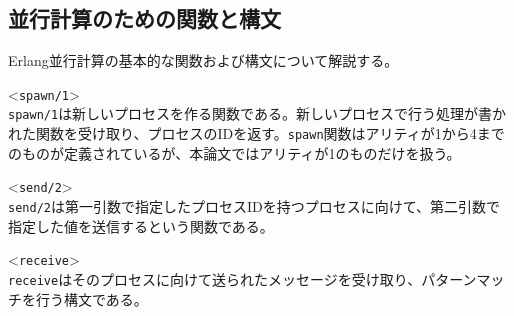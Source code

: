 \subsection{並行計算のための関数と構文}

Erlang並行計算の基本的な関数および構文について解説する。

\begin{description}
\item<\lstinline{spawn/1}>\mbox{}\\
  \lstinline{spawn/1}は新しいプロセスを作る関数である。新しいプロセスで行う処理が書かれた関数を受け取り、プロセスのIDを返す。\lstinline{spawn}関数はアリティが1から4までのものが定義されているが、本論文ではアリティが1のものだけを扱う。
\item<\lstinline{send/2}>\mbox{}\\
  \lstinline{send/2}は第一引数で指定したプロセスIDを持つプロセスに向けて、第二引数で指定した値を送信するという関数である。
\item<\lstinline{receive}>\mbox{}\\
  \lstinline{receive}はそのプロセスに向けて送られたメッセージを受け取り、パターンマッチを行う構文である。
\end{description}
